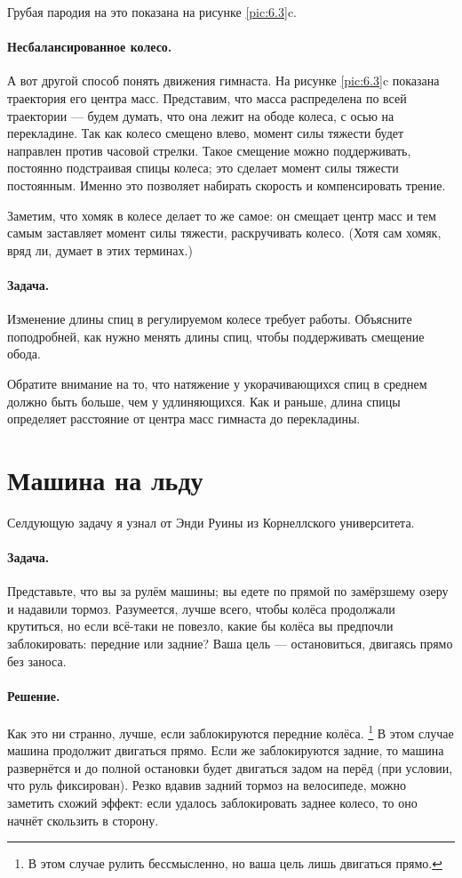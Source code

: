 Грубая пародия на это показана на рисунке \ref{pic:6.3}c.

\paragraph{Несбалансированное колесо.}
А вот другой способ понять движения гимнаста.
На рисунке \ref{pic:6.3}c показана траектория его центра масс.
Представим, что масса распределена по всей траектории --- будем думать, что она лежит на ободе колеса, с осью на перекладине.
Так как колесо смещено влево, момент силы тяжести будет направлен против часовой стрелки.
Такое смещение можно поддерживать, постоянно подстраивая спицы колеса;
это сделает момент силы тяжести постоянным.
Именно это позволяет набирать скорость и компенсировать трение.

Заметим, что хомяк в колесе делает то же самое:
он смещает центр масс и тем самым заставляет момент силы тяжести, раскручивать колесо.
(Хотя сам хомяк, вряд ли, думает в этих терминах.)

\paragraph{Задача.}
Изменение длины спиц в регулируемом колесе требует работы.
Объясните поподробней, как нужно менять длины спиц, чтобы поддерживать смещение обода.

Обратите внимание на то, что натяжение у укорачивающихся спиц в среднем должно быть больше, чем у удлиняющихся.
Как и раньше, длина спицы определяет расстояние от центра масс гимнаста до перекладины.

\section{Машина на льду}

Селдующую задачу я узнал от Энди Руины %
из Корнеллского университета.

\paragraph{Задача.}
Представьте, что вы за рулём машины;
вы едете по прямой по замёрзшему озеру и надавили тормоз.
Разумеется, лучше всего, чтобы колёса продолжали крутиться,
но если всё-таки не повезло, какие бы колёса вы предпочли заблокировать: передние или задние?
Ваша цель — остановиться, двигаясь прямо без заноса.

\paragraph{Решение.}
Как это ни странно, лучше, если заблокируются передние колёса.%
\footnote{В этом случае рулить бессмысленно, но ваша цель лишь двигаться прямо.}
В этом случае машина продолжит двигаться прямо.
Если же заблокируются задние, то машина развернётся и до полной остановки будет  двигаться задом на перёд (при условии, что руль фиксирован).
Резко вдавив задний тормоз на велосипеде, можно заметить схожий эффект:
если удалось заблокировать заднее колесо, то оно начнёт скользить в сторону.

